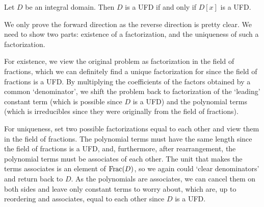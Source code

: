 \begin{theorem}\label{thrm-UFD-iff-polynomial-ring-is-UFD}
    Let $D$ be an integral domain. Then $D$ is a UFD if and only if $D[x]$ is a UFD.
\end{theorem}
\begin{proofsketch}
    We only prove the forward direction as the reverse direction is pretty clear. We need to show two parts: existence of a factorization, and the uniqueness of such a factorization.

    For existence, we view the original problem as factorization in the field of fractions, which we can definitely find a unique factorization for since the field of fractions is a UFD. By multiplying the coefficients of the factors obtained by a common `denominator', we shift the problem back to factorization of the `leading' constant term (which is possible since $D$ is a UFD) and the polynomial terms (which is irreducibles since they were originally from the field of fractions).

    For uniqueness, set two possible factorizations equal to each other and view them in the field of fractions. The polynomial terms must have the same length since the field of fractions is a UFD, and, furthermore, after rearrangement, the polynomial terms must be associates of each other. The unit that makes the terms associates is an element of $\mathrm{Frac}(D)$, so we again could `clear denominators' and return back to $D$. As the polynomials are associates, we can cancel them on both sides and leave only constant terms to worry about, which are, up to reordering and associates, equal to each other since $D$ is a UFD.
\end{proofsketch}
